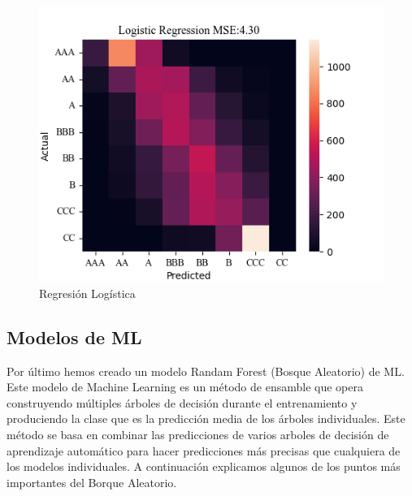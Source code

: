 \documentclass{article}
\begin{document}
\begin{figure}[H]
\begin{minipage}[b]{0.32\textwidth}
        \label{fig:confusion_matrix_polyreg_model}
    \end{minipage}
    \hfill %
    \begin{minipage}[b]{0.32\textwidth}
        \includegraphics[width=\textwidth]{confusion_matrix_logistic_model.png}
        \caption{Regresión Logística}
        \label{fig:confusion_matrix_logistic_model}
    \end{minipage}
\end{figure}

\subsection{Modelos de ML}

Por último hemos creado un modelo Randam Forest (Bosque Aleatorio) de ML. Este modelo de Machine Learning es un método de ensamble que opera construyendo múltiples árboles de decisión durante el entrenamiento y produciendo la clase que es la predicción media de los árboles individuales. Este método se basa en combinar las predicciones de varios arboles de decisión de aprendizaje automático para hacer predicciones más precisas que cualquiera de los modelos individuales. A continuación explicamos algunos de los puntos más importantes del Borque Aleatorio.
\end{document}
